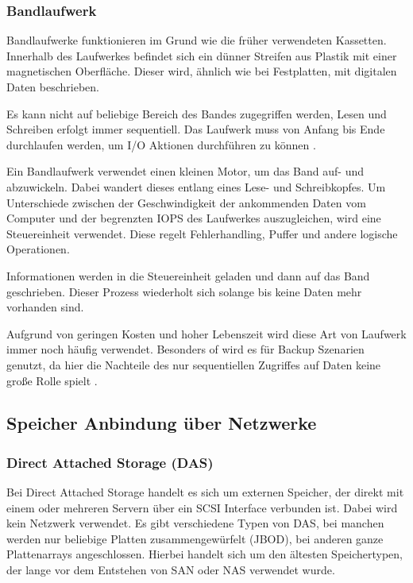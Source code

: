 \subsubsection{Bandlaufwerk}

Bandlaufwerke funktionieren im Grund wie die früher verwendeten Kassetten. Innerhalb des Laufwerkes befindet sich ein dünner Streifen aus Plastik mit einer magnetischen Oberfläche. Dieser wird, ähnlich wie bei Festplatten, mit digitalen Daten beschrieben. 

Es kann nicht auf beliebige Bereich des Bandes zugegriffen werden, Lesen und Schreiben erfolgt immer sequentiell. Das Laufwerk muss von Anfang bis Ende durchlaufen werden, um I/O Aktionen durchführen zu können \parencite{adrc.2009}.

Ein Bandlaufwerk verwendet einen kleinen Motor, um das Band auf- und abzuwickeln. Dabei wandert dieses entlang eines Lese- und Schreibkopfes. Um Unterschiede zwischen der Geschwindigkeit der ankommenden Daten vom Computer und der begrenzten \gls{IOPS} des Laufwerkes auszugleichen, wird eine Steuereinheit verwendet. Diese regelt Fehlerhandling, Puffer und andere logische Operationen.

Informationen werden in die Steuereinheit geladen und dann auf das Band geschrieben. Dieser Prozess wiederholt sich solange bis keine Daten mehr vorhanden sind.

Aufgrund von geringen Kosten und hoher Lebenszeit wird diese Art von Laufwerk immer noch häufig verwendet. Besonders of wird es für Backup Szenarien genutzt, da hier die Nachteile des nur sequentiellen Zugriffes auf Daten keine große Rolle spielt \parencite{adrc.2009}. 

\subsection{Speicher Anbindung über Netzwerke}
\subsubsection{Direct Attached Storage (DAS)}

Bei Direct Attached Storage handelt es sich um externen Speicher, der direkt mit einem oder mehreren Servern über ein SCSI Interface verbunden ist. Dabei wird kein Netzwerk verwendet. Es gibt verschiedene Typen von DAS, bei manchen werden nur beliebige Platten zusammengewürfelt (\ac{JBOD}), bei anderen ganze Plattenarrays angeschlossen.
Hierbei handelt sich um den ältesten Speichertypen, der lange vor dem Entstehen von SAN oder NAS verwendet wurde.

